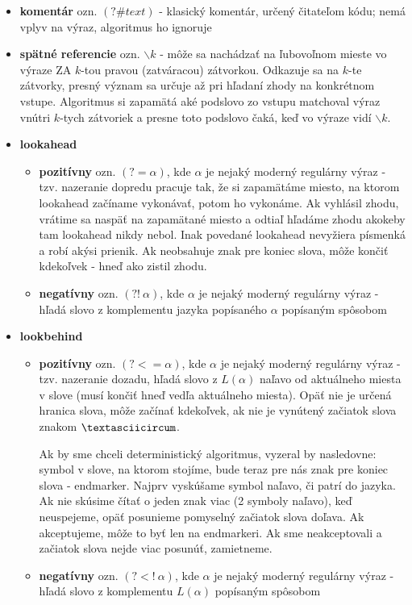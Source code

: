 \begin{itemize}
\item \textbf{komentár} ozn. $(?\# \textit{text})$ - klasický komentár, určený čitateľom kódu; nemá vplyv na výraz, algoritmus ho ignoruje
\item \textbf{spätné referencie} ozn. $\backslash k$ - môže sa nachádzať na ľubovoľnom mieste vo výraze ZA $k$-tou pravou (zatváracou) zátvorkou. Odkazuje sa na $k$-te zátvorky, presný význam sa určuje až pri hľadaní zhody na konkrétnom vstupe. Algoritmus si zapamätá aké podslovo zo vstupu matchoval výraz vnútri $k$-tych zátvoriek a presne toto podslovo čaká, keď vo výraze vidí $\backslash k$.
\item \textbf{lookahead}
\begin{itemize}
\item \textbf{pozitívny} ozn. $(?=\alpha)$, kde $\alpha$ je nejaký moderný regulárny výraz - tzv. nazeranie dopredu pracuje tak, že si zapamätáme miesto, na ktorom lookahead začíname vykonávať, potom ho vykonáme. Ak vyhlásil zhodu, vrátime sa naspäť na zapamätané miesto a odtiaľ hľadáme zhodu akokeby tam lookahead nikdy nebol. Inak povedané lookahead nevyžiera písmenká a robí akýsi prienik. Ak neobsahuje znak pre koniec slova, môže končiť kdekoľvek - hneď ako zistil zhodu.
\item \textbf{negatívny} ozn. $(?!~\alpha)$, kde $\alpha$ je nejaký moderný regulárny výraz - hľadá slovo z komplementu jazyka popísaného $\alpha$ popísaným spôsobom
\end{itemize}
\item \textbf{lookbehind}
\begin{itemize}
\item \textbf{pozitívny} ozn. $(?<=\alpha)$, kde $\alpha$ je nejaký moderný regulárny výraz - tzv. nazeranie dozadu, hľadá slovo z $L(\alpha)$ naľavo od aktuálneho miesta v slove (musí končiť hneď vedľa aktuálneho miesta). Opäť nie je určená hranica slova, môže začínať kdekoľvek, ak nie je vynútený začiatok slova znakom $\textasciicircum$. 

Ak by sme chceli deterministický algoritmus, vyzeral by nasledovne: symbol v slove, na ktorom stojíme, bude teraz pre nás znak pre koniec slova - endmarker. Najprv vyskúšame symbol naľavo, či patrí do jazyka. Ak nie skúsime čítať o jeden znak viac (2 symboly naľavo), keď neuspejeme, opäť posunieme pomyselný začiatok slova doľava. Ak akceptujeme, môže to byť len na endmarkeri. Ak sme neakceptovali a začiatok slova nejde viac posunúť, zamietneme.
\item \textbf{negatívny} ozn. $(?<!~\alpha)$, kde $\alpha$ je nejaký moderný regulárny výraz - hľadá slovo z komplementu $L(\alpha)$ popísaným spôsobom
\end{itemize}
\end{itemize}

